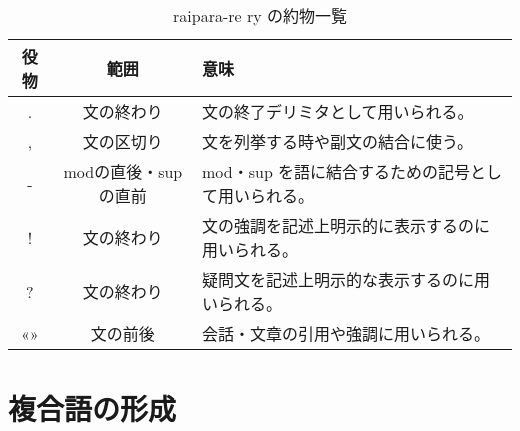 \begin{table}[H]
    \centering
    \caption{raipara-re ry の約物一覧}
    \label{table:list-of-punctuation}
    \begin{tabular}{ccl}
        \toprule
        役物 & 範囲 & 意味 \\
        \midrule
        .  & 文の終わり & 文の終了デリミタとして用いられる。 \\
        ,  & 文の区切り & 文を列挙する時や副文の結合に使う。 \\
        -  & modの直後・supの直前 & mod・sup を語に結合するための記号として用いられる。 \\
        !  & 文の終わり & 文の強調を記述上明示的に表示するのに用いられる。 \\
        ?  & 文の終わり & 疑問文を記述上明示的な表示するのに用いられる。 \\
        «» & 文の前後 & 会話・文章の引用や強調に用いられる。 \\
        \bottomrule
    \end{tabular}
\end{table}

\section{複合語の形成}